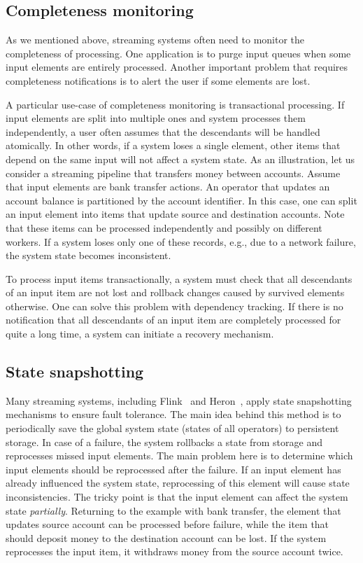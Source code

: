 \subsection{Completeness monitoring}
As we mentioned above, streaming systems often need to monitor the completeness of processing. One application is to purge input queues when some input elements are entirely processed. Another important problem that requires completeness notifications is to alert the user if some elements are lost.

A particular use-case of completeness monitoring is transactional processing. If input elements are split into multiple ones and system processes them independently, a user often assumes that the descendants will be handled atomically. In other words, if a system loses a single element, other items that depend on the same input will not affect a system state. As an illustration, let us consider a streaming pipeline that transfers money between accounts. Assume that input elements are bank transfer actions. An operator that updates an account balance is partitioned by the account identifier. In this case, one can split an input element into items that update source and destination accounts. Note that these items can be processed independently and possibly on different workers. If a system loses only one of these records, e.g., due to a network failure, the system state becomes inconsistent.

To process input items transactionally, a system must check that all descendants of an input item are not lost and rollback changes caused by survived elements otherwise. One can solve this problem with dependency tracking. If there is no notification that all descendants of an input item are completely processed for quite a long time, a system can initiate a recovery mechanism.

\subsection{State snapshotting}
Many streaming systems, including Flink~\cite{Carbone:2017:SMA:3137765.3137777} and Heron~\cite{Kulkarni:2015:THS:2723372.2742788}, apply state snapshotting mechanisms to ensure fault tolerance. The main idea behind this method is to periodically save the global system state (states of all operators) to persistent storage. In case of a failure, the system rollbacks a state from storage and reprocesses missed input elements. The main problem here is to determine which input elements should be reprocessed after the failure. If an input element has already influenced the system state, reprocessing of this element will cause state inconsistencies. The tricky point is that the input element can affect the system state {\em partially}. Returning to the example with bank transfer, the element that updates source account can be processed before failure, while the item that should deposit money to the destination account can be lost. If the system reprocesses the input item, it withdraws money from the source account twice.

